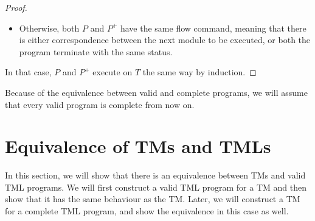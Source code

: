 \begin{appendices}
\begin{proof}
\begin{itemize}
\begin{itemize}
\begin{itemize}
                \item Otherwise, both $P$ and $P^+$ have the same flow command, meaning that there is either correspondence between the next module to be executed, or both the program terminate with the same status. 
            \end{itemize}
        \end{itemize}
    \end{itemize}
    In that case, $P$ and $P^+$ execute on $T$ the same way by induction.
\end{proof}

Because of the equivalence between valid and complete programs, we will assume that every valid program is complete from now on.

\section{Equivalence of TMs and TMLs}
In this section, we will show that there is an equivalence between TMs and valid TML programs. We will first construct a valid TML program for a TM and then show that it has the same behaviour as the TM. Later, we will construct a TM for a complete TML program, and show the equivalence in this case as well.

\begin{figure}[htb]
    \centering
\end{figure}
\end{appendices}
